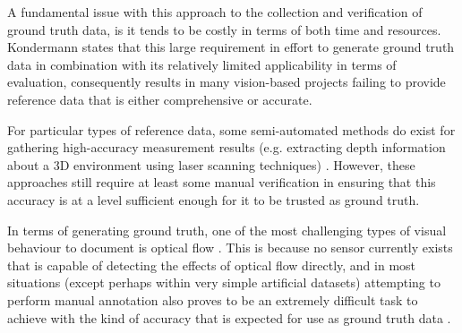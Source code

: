 A fundamental issue with this approach to the collection and verification of ground truth data, is it tends to be costly in terms of both time and resources. Kondermann \cite{kondermann} states that this large requirement in effort to generate ground truth data in combination with its relatively limited applicability in terms of evaluation, consequently results in many vision-based projects failing to provide reference data that is either comprehensive or accurate.

For particular types of reference data, some semi-automated methods do exist for gathering high-accuracy measurement results (e.g. extracting depth information about a 3D environment using laser scanning techniques) \cite{haltakov}. However, these approaches still require at least some manual verification in ensuring that this accuracy is at a level sufficient enough for it to be trusted as ground truth.

In terms of generating ground truth, one of the most challenging types of visual behaviour to document is optical flow \cite{kondermann}. This is because no sensor currently exists that is capable of detecting the effects of optical flow directly, and in most situations (except perhaps within very simple artificial datasets) attempting to perform manual annotation also proves to be an extremely difficult task to achieve with the kind of accuracy that is expected for use as ground truth data \cite{haltakov}. 


